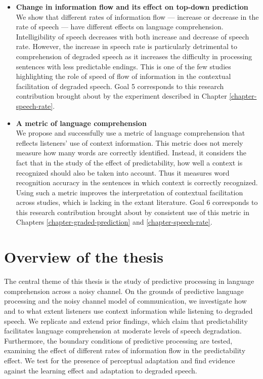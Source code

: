 \documentclass[a4paper, nobind]{templates/ociamthesis}
\begin{document}
\begin{itemize}
\item
  \textbf{Change in information flow and its effect on top-down prediction}\\
  We show that different rates of information flow --- increase or decrease in the rate of speech --- have different effects on language comprehension.
  Intelligibility of speech decreases with both increase and decrease of speech rate.
  However, the increase in speech rate is particularly detrimental to comprehension of degraded speech as it increases the difficulty in processing sentences with less predictable endings.
  This is one of the few studies highlighting the role of speed of flow of information in the contextual facilitation of degraded speech.
  Goal 5 corresponds to this research contribution brought about by the experiment described in Chapter \ref{chapter-speech-rate}.
\item
  \textbf{A metric of language comprehension}\\
  We propose and successfully use a metric of language comprehension that reflects listeners' use of context information.
  This metric does not merely measure how many words are correctly identified.
  Instead, it considers the fact that in the study of the effect of predictability, how well a context is recognized should also be taken into account.
  Thus it measures word recognition accuracy in the sentences in which context is correctly recognized.
  Using such a metric improves the interpretation of contextual facilitation across studies, which is lacking in the extant literature.
  Goal 6 corresponds to this research contribution brought about by consistent use of this metric in Chapters \ref{chapter-graded-prediction} and \ref{chapter-speech-rate}.
\end{itemize}

\hypertarget{overview-of-the-thesis}{%
\section{Overview of the thesis}\label{overview-of-the-thesis}}

The central theme of this thesis is the study of predictive processing in language comprehension across a noisy channel.
On the grounds of predictive language processing and the noisy channel model of communication,
we investigate how and to what extent listeners use context information while listening to degraded speech.
We replicate and extend prior findings, which claim that predictability facilitates language comprehension at moderate levels of speech degradation.
Furthermore, the boundary conditions of predictive processing are tested, examining the effect of different rates of information flow in the predictability effect.
We test for the presence of perceptual adaptation and find evidence against the learning effect and adaptation to degraded speech.
\end{document}

